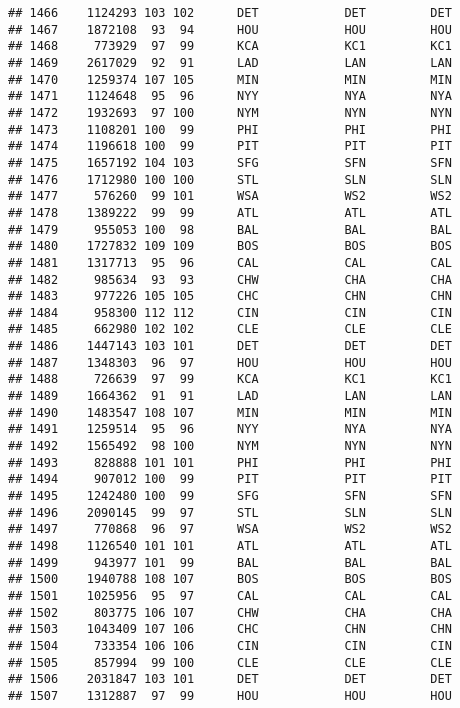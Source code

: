 \documentclass[]{article}
\begin{document}
\begin{verbatim}
## 1466    1124293 103 102      DET            DET         DET
## 1467    1872108  93  94      HOU            HOU         HOU
## 1468     773929  97  99      KCA            KC1         KC1
## 1469    2617029  92  91      LAD            LAN         LAN
## 1470    1259374 107 105      MIN            MIN         MIN
## 1471    1124648  95  96      NYY            NYA         NYA
## 1472    1932693  97 100      NYM            NYN         NYN
## 1473    1108201 100  99      PHI            PHI         PHI
## 1474    1196618 100  99      PIT            PIT         PIT
## 1475    1657192 104 103      SFG            SFN         SFN
## 1476    1712980 100 100      STL            SLN         SLN
## 1477     576260  99 101      WSA            WS2         WS2
## 1478    1389222  99  99      ATL            ATL         ATL
## 1479     955053 100  98      BAL            BAL         BAL
## 1480    1727832 109 109      BOS            BOS         BOS
## 1481    1317713  95  96      CAL            CAL         CAL
## 1482     985634  93  93      CHW            CHA         CHA
## 1483     977226 105 105      CHC            CHN         CHN
## 1484     958300 112 112      CIN            CIN         CIN
## 1485     662980 102 102      CLE            CLE         CLE
## 1486    1447143 103 101      DET            DET         DET
## 1487    1348303  96  97      HOU            HOU         HOU
## 1488     726639  97  99      KCA            KC1         KC1
## 1489    1664362  91  91      LAD            LAN         LAN
## 1490    1483547 108 107      MIN            MIN         MIN
## 1491    1259514  95  96      NYY            NYA         NYA
## 1492    1565492  98 100      NYM            NYN         NYN
## 1493     828888 101 101      PHI            PHI         PHI
## 1494     907012 100  99      PIT            PIT         PIT
## 1495    1242480 100  99      SFG            SFN         SFN
## 1496    2090145  99  97      STL            SLN         SLN
## 1497     770868  96  97      WSA            WS2         WS2
## 1498    1126540 101 101      ATL            ATL         ATL
## 1499     943977 101  99      BAL            BAL         BAL
## 1500    1940788 108 107      BOS            BOS         BOS
## 1501    1025956  95  97      CAL            CAL         CAL
## 1502     803775 106 107      CHW            CHA         CHA
## 1503    1043409 107 106      CHC            CHN         CHN
## 1504     733354 106 106      CIN            CIN         CIN
## 1505     857994  99 100      CLE            CLE         CLE
## 1506    2031847 103 101      DET            DET         DET
## 1507    1312887  97  99      HOU            HOU         HOU

\end{verbatim}
\end{document}
